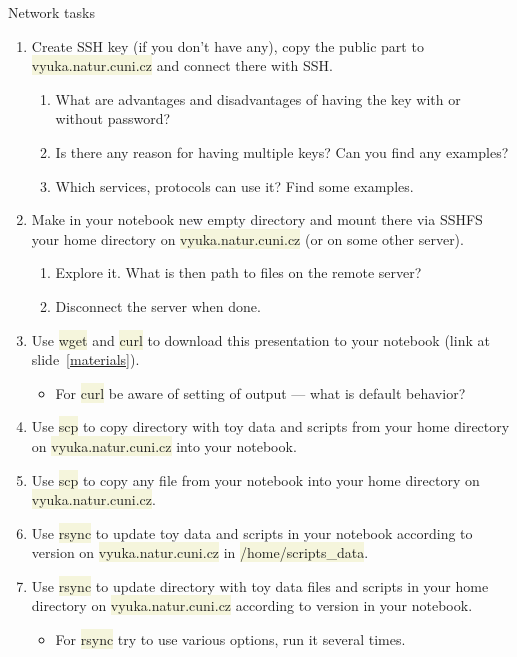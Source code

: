 \documentclass[compress, ucs, xelatex, 11pt, xcolor=svgnames, aspectratio=169,
	hyperref={
		bookmarks=true,
		unicode=true,
		colorlinks=true,
		pdftitle={Linux, command line and MetaCentrum},
		plainpages=false,
		pdfauthor={Vojtech Zeisek},
		pdfsubject={Course about use of Linux command line, writing shell scripts and using MetaCentrum of CESNET},
		pdfcreator={XeLaTeX},
		pdfkeywords={Linux, GNU, BASH, shell, command line, MetaCentrum},
		linkcolor=DarkRed, %
		anchorcolor=DarkBlue, %
		citecolor=Indigo, %
		filecolor=NavyBlue, %
		menucolor=DarkMagenta, %
		urlcolor=DarkBlue, %
		pdftex},
	url={hyphens, lowtilde} %
	]{beamer}
\renewcommand{\texttt}[1]{\colorbox{Beige}{{\ttfamily #1}}}
\begin{document}
\begin{frame}[allowframebreaks]{Network tasks}
	\begin{enumerate}
		\item Create SSH key (if you don't have any), copy the public part to \texttt{vyuka.natur.cuni.cz} and connect there with SSH.
		\begin{enumerate}
			\item What are advantages and disadvantages of having the key with or without password?
			\item Is there any reason for having multiple keys? Can you find any examples?
			\item Which services, protocols can use it? Find some examples.
		\end{enumerate}
		\item Make in your notebook new empty directory and mount there via SSHFS your home directory on \texttt{vyuka.natur.cuni.cz} (or on some other server).
		\begin{enumerate}
			\item Explore it. What is then path to files on the remote server?
			\item Disconnect the server when done.
		\end{enumerate}
		\item Use \texttt{wget} and \texttt{curl} to download this presentation to your notebook (link at slide~\ref{materials}).
		\begin{itemize}
			\item For \texttt{curl} be aware of setting of output --- what is default behavior?
		\end{itemize}
		\item Use \texttt{scp} to copy directory with toy data and scripts from your home directory on \texttt{vyuka.natur.cuni.cz} into your notebook.
		\item Use \texttt{scp} to copy any file from your notebook into your home directory on \texttt{vyuka.natur.cuni.cz}.
		\item Use \texttt{rsync} to update toy data and scripts in your notebook according to version on \texttt{vyuka.natur.cuni.cz} in \texttt{/home/scripts\_data}.
		\item Use \texttt{rsync} to update directory with toy data files and scripts in your home directory on \texttt{vyuka.natur.cuni.cz} according to version in your notebook.
		\begin{itemize}
			\item For \texttt{rsync} try to use various options, run it several times.

\end{itemize}
\end{enumerate}
\end{frame}
\end{document}
